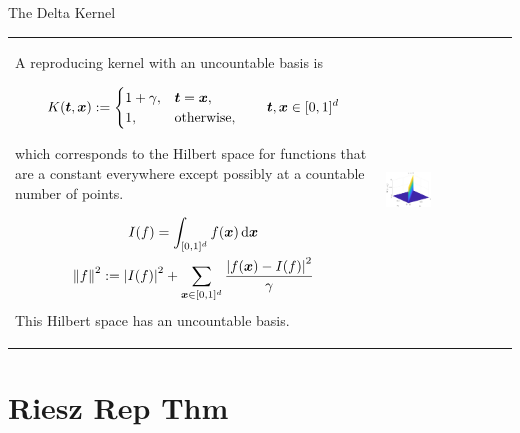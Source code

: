 \documentclass[10pt,compress,xcolor={usenames,dvipsnames},aspectratio=169]{beamer}
\begin{document}
\begin{frame}{The Delta Kernel}
	\vspace{-2ex}
	\begin{tabular}{m{}m{}}
		A reproducing kernel with an uncountable basis is 
		
		\vspace{-4ex}
		\begin{equation*}
			K(\boldsymbol{t},\boldsymbol{x}) : = \begin{cases} 1 + \gamma, & \boldsymbol{t} = \boldsymbol{x}, \\ 1, & \text{otherwise}, \end{cases}
			\qquad \boldsymbol{t}, \boldsymbol{x} \in [0,1]^d
		\end{equation*}
		
		\vspace{-2ex}
		which corresponds to the Hilbert space for functions that are a constant everywhere except possibly at a countable number of points.
		
		\vspace{-4ex}
		\begin{gather*}
			I(f) = \int_{[0,1]^d} f(\boldsymbol{x}) \, {\rm d} \boldsymbol{x} \\
			\left \lVert f \right \rVert_{{}}^2 : = \left \lvert I(f) \right \rvert^2 + \sum_{\boldsymbol{x} \in [0,1]^d} \frac{\left \lvert f(\boldsymbol{x}) - I(f) \right \rvert^2}{\gamma}
		\end{gather*}
		This Hilbert space has an \alert{uncountable basis}.
		&
		\includegraphics[width=0.38\textwidth]{RK-deltaker.eps}
	\end{tabular}
\end{frame}


\section{Riesz Rep Thm}
\end{document}
